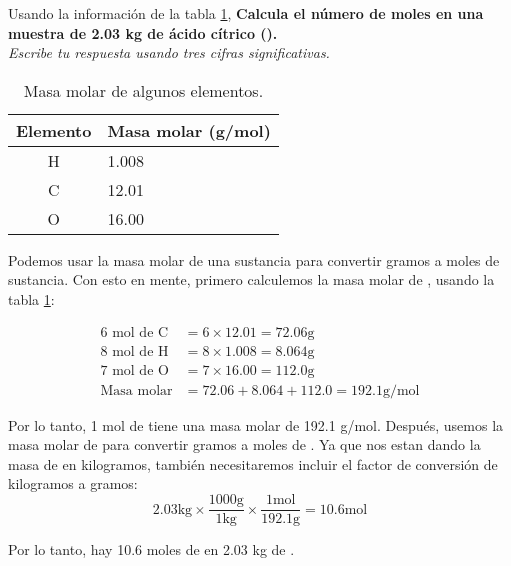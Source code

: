\begin{multicols}{2}
Usando la información de la tabla \ref{tab:q003},
\textbf{Calcula el número de moles en una muestra de 2.03 kg de ácido cítrico ().}\\
\emph{Escribe tu respuesta usando tres cifras significativas.}

    \begin{table}[H]
        \centering
        \caption{Masa molar de algunos elementos.}
        \label{tab:q003}
        \begin{tabular}{c|p{2.2cm}}
            \textbf{Elemento} & \textbf{Masa molar (g/mol)} \\\midrule
            H                 & 1.008                       \\\hline
            C                 & 12.01                       \\\hline
            O                 & 16.00                       \\\hline
            \bottomrule
        \end{tabular}
    \end{table}
\end{multicols}

\begin{solutionbox}{8cm}
    Podemos usar la masa molar de una sustancia para convertir gramos a moles de sustancia. Con esto en mente, primero calculemos la masa molar de , usando la tabla \ref{tab:q003}:

    \begin{align*}
        6 \text{ mol de C} & = 6 \times 12.01  = 72.06 \text{g}           \\
        8 \text{ mol de H} & = 8 \times 1.008 = 8.064 \text{g}            \\
        7 \text{ mol de O} & = 7 \times 16.00 = 112.0 \text{g}            \\
        \text{Masa molar} & = 72.06 + 8.064 + 112.0 = 192.1 \text{g/mol}
    \end{align*}

    Por lo tanto, 1 mol de  tiene una masa molar de 192.1 g/mol.
    Después, usemos la masa molar de  para convertir gramos a moles de .
    Ya que nos estan dando la masa de  en kilogramos, también necesitaremos incluir el factor de conversión de kilogramos a gramos:
    \[2.03 \text{kg} \times \frac{1000 \text{g}}{1 \text{kg}} \times \frac{1 \text{mol}}{192.1 \text{g}} = 10.6 \text{mol}\]

    Por lo tanto, hay 10.6 moles de  en 2.03 kg de .
\end{solutionbox}